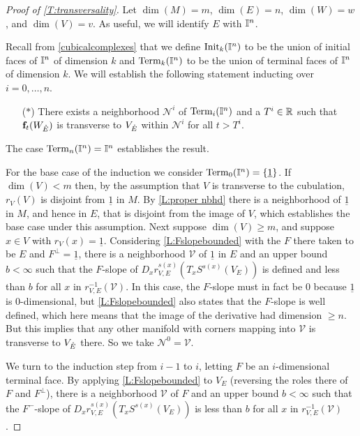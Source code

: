 \begin{proof}[Proof of \cref{T:transversality}]
	Let $\dim(M) = m$, $\dim(E) = n$, $\dim(W) = w$, and $\dim(V) = v$.
	As useful, we will identify $E$ with $\mathbb{I}^n$.

	Recall from \cref{cubicalcomplexes} that we define ${\rm Init}_k(\mathbb{I}^n)$ to be the union of initial faces of $\mathbb{I}^n$ of dimension $k$ and ${\rm Term}_k(\mathbb{I}^n)$ to be the union of terminal faces of $\mathbb{I}^n$ of dimension $k$.
	We will establish the following statement inducting over $i = 0, \dots, n$.
	\begin{itemize}
		\item[($\ast$)] There exists a neighborhood $\mathcal N^i$ of ${\rm Term}_{i}(\mathbb{I}^n)$ and a $T^i \in \mathbb{R}$ such that $\mathbf{f}_t(W_{\mathring{E}})$ is transverse to $V_{\mathring{E}}$ within $\mathcal N^i$ for all $t > T^i$.
	\end{itemize}
	The case $ {\rm Term}_{n}(\mathbb{I}^n) = \mathbb{I}^n$ establishes the result.

	For the base case of the induction we consider ${\rm Term}_0(\mathbb{I}^n) = \{\underline{1}\}$.
	If $\dim(V) < m$ then, by the assumption that $V$ is transverse to the cubulation, $r_V(V)$ is disjoint from $\underline{1}$ in $M$.
	By \cref{L:proper nbhd} there is a neighborhood of $\underline{1}$ in $M$, and hence in $E$, that is disjoint from the image of $V$, which establishes the base case under this assumption.
	Next suppose $\dim(V) \geq m$, and suppose $x \in V$ with $r_V(x) = \underline{1}$.
	Considering \cref{L:Fslopebounded} with the $F$ there taken to be $E$ and $F^\perp = \underline{1}$, there is a neighborhood $\mathcal{V}$ of $\underline{1}$ in $E$ and an upper bound $b < \infty$ such that the $F$-slope of $D_xr^{s(x)}_{V,E}(T_xS^{s(x)}(V_E))$ is defined and less than $b$ for all $x$ in $r_{V,E}^{-1}(\mathcal{V})$.
	In this case, the $F$-slope must in fact be $0$ because $\underline{1}$ is $0$-dimensional, but \cref{L:Fslopebounded} also states that the $F$-slope is well defined, which here means that the image of the derivative had dimension $\geq n$.
	But this implies that any other manifold with corners mapping into $\mathcal V$ is transverse to $V_{\mathring{E}}$ there.
	So we take $\mathcal N^0 = \mathcal V$.

	We turn to the induction step from $i-1$ to $i$, letting $F$ be an $i$-dimensional terminal face.
	By applying \cref{L:Fslopebounded} to $V_E$ (reversing the roles there of $F$ and $F^\perp$),
	there is a neighborhood $\mathcal{V}$ of $F$ and an upper bound $b < \infty$ such that
	the $F^-$-slope of $D_xr^{s(x)}_{V,E}(T_xS^{s(x)}(V_E))$ is less than $b$ for all $x$ in $r_{V,E}^{-1}(\mathcal{V})$.



\end{proof}
